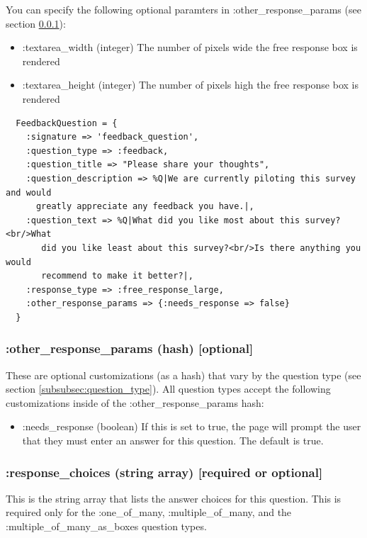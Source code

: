 \documentclass[12pt]{article}
\begin{document}
You can specify the following optional paramters in :other\_response\_params (see section \ref{subsubsec:other_response_params}):

\begin{itemize}
\item :textarea\_width (integer) \quad The number of pixels wide the free response box is rendered
\item :textarea\_height (integer) \quad The number of pixels high the free response box is rendered
\end{itemize}

\begin{verbatim}
  FeedbackQuestion = {
    :signature => 'feedback_question',
    :question_type => :feedback,
    :question_title => "Please share your thoughts",
    :question_description => %Q|We are currently piloting this survey and would 
      greatly appreciate any feedback you have.|,
    :question_text => %Q|What did you like most about this survey?<br/>What 
       did you like least about this survey?<br/>Is there anything you would 
       recommend to make it better?|,
    :response_type => :free_response_large,
    :other_response_params => {:needs_response => false}
  }
\end{verbatim}

\subsubsection{:other\_response\_params (hash) [optional]}\label{subsubsec:other_response_params}

These are optional customizations (as a hash) that vary by the question type (see section \ref{subsubsec:question_type}). All question types accept the following customizations inside of the :other\_response\_params hash:

\begin{itemize}
\item :needs\_response (boolean) \quad If this is set to true, the page will prompt the user that they must enter an answer for this question. The default is true. 
\end{itemize}

\subsubsection{:response\_choices (string array) [required or optional]} 

This is the string array that lists the answer choices for this question. This is required only for the :one\_of\_many, :multiple\_of\_many, and the :multiple\_of\_many\_as\_boxes question types.
\end{document}
